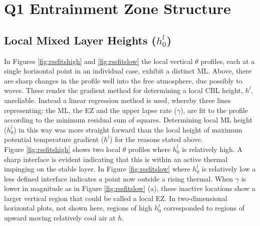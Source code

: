 \clearpage

\section{Q1 Entrainment Zone Structure}
\label{sec:q1}

\subsection{Local Mixed Layer Heights ($h_{0}^{l}$)}
\label{subsec:locmlh}     
\FloatBarrier

In Figures \ref{fig:rssfitshigh} and \ref{fig:rssfitslow} the local vertical $\theta$ profiles,  each at a single horizontal point in an individual case, exhibit a distinct \acs{ML}.  Above, there are sharp changes in the profile well into the free 
atmosphere, due possibly to waves.  These render the gradient method for determining a local \acs{CBL} height, $h^{l}$, 
unreliable.  Instead a linear regression method is used, whereby three lines representing: the
 \acs{ML}, the \acs{EZ} and the upper lapse rate ($\gamma$), are fit to the profile according 
to the minimum residual sum of squares.  Determining local \acs{ML} height ($h_{0}^{l}$) in this way was 
more straight forward than the local height of maximum potential temperature gradient 
($h^{l}$) for the reasons stated above.\\  




Figure \ref{fig:rssfitshigh} shows two local $\theta$ profiles where $h_{0}^{l}$ is relatively high.  
A sharp interface is evident indicating that this is within an active thermal impinging on the stable layer.
In Figure \ref{fig:rssfitslow} where $h_{0}^{l}$ is relatively low a less defined interface indicates 
a point now outside a rising thermal.  When $\gamma$ is lower in magnitude as in Figure \ref{fig:rssfitslow} (a), 
these inactive locations show a larger vertical region that could be called a local \acs{EZ}.  
In two-dimensional horizontal plots, not shown here, regions of high 
$h_{0}^{l}$ corresponded to regions of upward moving relatively cool air at $h$.\\

